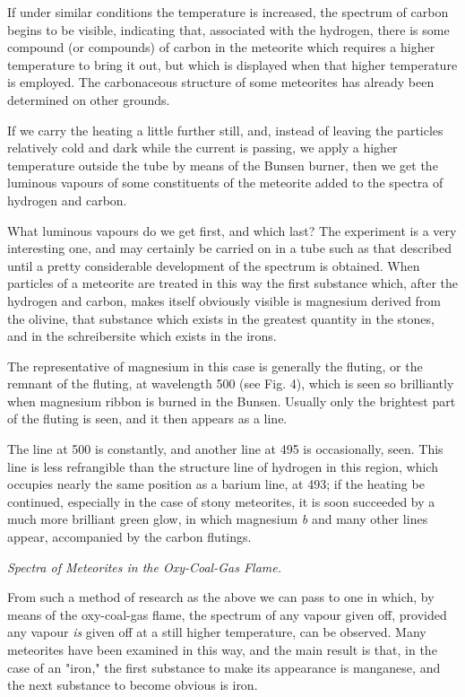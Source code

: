 \documentclass[a4paper, 12pt, oneside, polutonikogreek, english]{article}
\begin{document}
If under similar conditions the temperature is increased, the spectrum of carbon begins to be visible, indicating that, associated with the hydrogen, there is some compound (or compounds) of carbon in the meteorite which requires a higher temperature to bring it out, but which is displayed when that higher temperature is employed. The carbonaceous structure of some meteorites has already been determined on other grounds.

If we carry the heating a little further still, and, instead of leaving the particles relatively cold and dark while the current is passing, we apply a higher temperature outside the tube by means of the Bunsen burner, then we get the luminous vapours of some constituents of the meteorite added to the spectra of hydrogen and carbon.

What luminous vapours do we get first, and which last? The experiment is a very interesting one, and may certainly be carried on in a tube such as that described until a pretty considerable development of the spectrum is obtained. When particles of a meteorite are treated in this way the first substance which, after the hydrogen and carbon, makes itself obviously visible is magnesium derived from the olivine, that substance which exists in the greatest quantity in the stones, and in the schreibersite which exists in the irons.

The representative of magnesium in this case is generally the fluting, or the remnant of the fluting, at wavelength 500 (see Fig. 4), which is seen so brilliantly when magnesium ribbon is burned in the Bunsen. Usually only the brightest part of the fluting is seen, and it then appears as a line.

The line at 500 is constantly, and another line at 495 is occasionally, seen. This line is less refrangible than the structure line of hydrogen in this region, which occupies nearly the same position as a barium line, at 493; if the heating be continued, especially in the case of stony meteorites, it is soon succeeded by a much more brilliant green glow, in which magnesium \emph{b} and many other lines appear, accompanied by the carbon flutings.

\emph{Spectra of Meteorites in the Oxy-Coal-Gas Flame.}

From such a method of research as the above we can pass to one in which, by means of the oxy-coal-gas flame, the spectrum of any vapour given off, provided any vapour \emph{is} given off at a still higher temperature, can be observed. Many meteorites have been examined in this way, and the main result is that, in the case of an "iron," the first substance to make its appearance is manganese, and the next substance to become obvious is iron.
\end{document}
